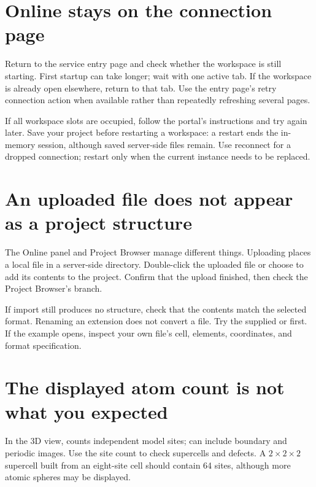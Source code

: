 \section{Online stays on the connection page}

Return to the service entry page and check whether the workspace is still starting. First startup can take longer; wait with one active tab. If the workspace is already open elsewhere, return to that tab. Use the entry page's retry connection action when available rather than repeatedly refreshing several pages.

If all workspace slots are occupied, follow the portal's instructions and try again later. Save your project before restarting a workspace: a restart ends the in-memory session, although saved server-side files remain. Use reconnect for a dropped connection; restart only when the current instance needs to be replaced.

\section{An uploaded file does not appear as a project structure}

The Online  panel and Project Browser manage different things. Uploading places a local file in a server-side directory. Double-click the uploaded file or choose  to add its contents to the project. Confirm that the upload finished, then check the Project Browser's  branch.

If import still produces no structure, check that the contents match the selected format. Renaming an extension does not convert a file. Try the supplied \mbox{} or \mbox{} first. If the example opens, inspect your own file's cell, elements, coordinates, and format specification.

\section{The displayed atom count is not what you expected}

In the 3D view,  counts independent model sites;  can include boundary and periodic images. Use the site count to check supercells and defects. A $2\times2\times2$ supercell built from an eight-site cell should contain 64 sites, although more atomic spheres may be displayed.

